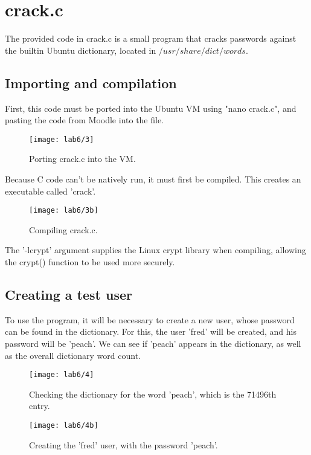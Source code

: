 \section{crack.c}\label{sec:crack.c}
The provided code in crack.c is a small program that cracks passwords against the builtin Ubuntu dictionary,
located in $/usr/share/dict/words$.

\subsection{Importing and compilation}\label{subsec:importing-and-compilation}
First, this code must be ported into the Ubuntu VM using "nano crack.c", and pasting the code from Moodle
into the file.

\begin{figure}[H]
    \centering
    \texttt{[image: lab6/3]}
    \caption{Porting crack.c into the VM.}
    \label{fig:nanoCrackC}
\end{figure}

Because C code can't be natively run, it must first be compiled.
This creates an executable called 'crack'.

\begin{figure}[H]
    \centering
    \texttt{[image: lab6/3b]}
    \caption{Compiling crack.c.}
    \label{fig:compile}
\end{figure}

The '-lcrypt' argument supplies the Linux crypt library when compiling, allowing the crypt() function
to be used more securely.

\subsection{Creating a test user}\label{subsec:creating-a-test-user}
To use the program, it will be necessary to create a new user, whose password can be found in the dictionary.
For this, the user 'fred' will be created, and his password will be 'peach'.
We can see if 'peach' appears in the dictionary, as well as the overall dictionary word count.

\begin{figure}[H]
    \centering
    \texttt{[image: lab6/4]}
    \caption{Checking the dictionary for the word 'peach', which is the 71496th entry.}
    \label{fig:checkDict}
\end{figure}

\begin{figure}[H]
    \centering
    \texttt{[image: lab6/4b]}
    \caption{Creating the 'fred' user, with the password 'peach'.}
    \label{fig:createFred}
\end{figure}

